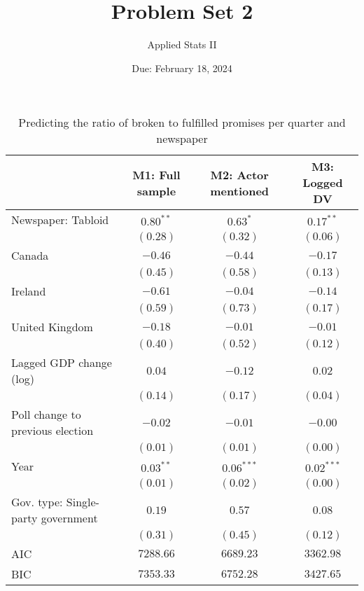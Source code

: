\documentclass[12pt,letterpaper]{article}
\title{Problem Set 2}
\date{Due: February 18, 2024}
\author{Applied Stats II}
\begin{document}
	
\begin{table}[!h]
\caption{Predicting the ratio of broken to fulfilled promises per quarter and newspaper}
\begin{center}
\begin{footnotesize}
\begin{tabular}{l c c c}
\hline
 & M1: Full sample & M2: Actor mentioned & M3: Logged DV \\
\hline
Newspaper: Tabloid                 & $0.80^{**}$ & $0.63^{*}$   & $0.17^{**}$  \\
                                   & $(0.28)$    & $(0.32)$     & $(0.06)$     \\
Canada                             & $-0.46$     & $-0.44$      & $-0.17$      \\
                                   & $(0.45)$    & $(0.58)$     & $(0.13)$     \\
Ireland                            & $-0.61$     & $-0.04$      & $-0.14$      \\
                                   & $(0.59)$    & $(0.73)$     & $(0.17)$     \\
United Kingdom                     & $-0.18$     & $-0.01$      & $-0.01$      \\
                                   & $(0.40)$    & $(0.52)$     & $(0.12)$     \\
Lagged GDP change (log)            & $0.04$      & $-0.12$      & $0.02$       \\
                                   & $(0.14)$    & $(0.17)$     & $(0.04)$     \\
Poll change to previous election   & $-0.02$     & $-0.01$      & $-0.00$      \\
                                   & $(0.01)$    & $(0.01)$     & $(0.00)$     \\
Year                               & $0.03^{**}$ & $0.06^{***}$ & $0.02^{***}$ \\
                                   & $(0.01)$    & $(0.02)$     & $(0.00)$     \\
Gov. type: Single-party government & $0.19$      & $0.57$       & $0.08$       \\
                                   & $(0.31)$    & $(0.45)$     & $(0.12)$     \\
\hline
AIC                                & $7288.66$   & $6689.23$    & $3362.98$    \\
BIC                                & $7353.33$   & $6752.28$    & $3427.65$    \\

\end{tabular}
\end{footnotesize}
\end{center}
\end{table}
\end{document}
